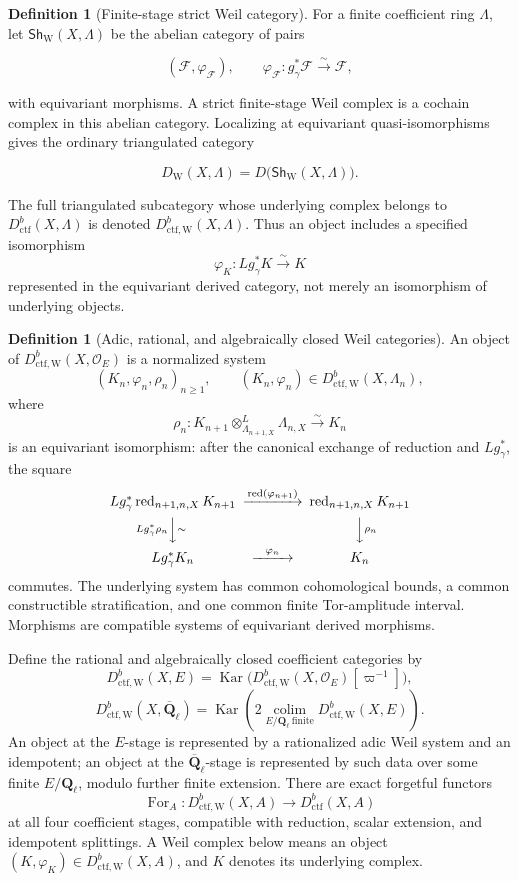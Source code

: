 \documentclass[10pt]{article}
\theoremstyle{definition}
\newtheorem{definition}[theorem]{Definition}
\newcommand{\Ql}{\mathbf Q_\ell}
\newcommand{\Qlb}{\overline{\mathbf Q}_\ell}
\newcommand{\OO}{\mathcal O}
\newcommand{\Dctf}{D^b_{\mathrm{ctf}}}
\newcommand{\red}{\operatorname{red}}
\newcommand{\DctfW}{D^b_{\mathrm{ctf,W}}}
\begin{document}
\begin{definition}[Finite-stage strict Weil category]
For a finite coefficient ring \(\Lambda\), let
\(\mathsf{Sh}_{\mathrm W}(X,\Lambda)\) be the abelian category of pairs

\[
 (\mathcal F,\varphi_{\mathcal F}),\qquad
 \varphi_{\mathcal F}:g_\gamma^*\mathcal F\xrightarrow{\sim}\mathcal F,
\]

with equivariant morphisms.  A strict finite-stage Weil complex is a cochain
complex in this abelian category.  Localizing at equivariant
quasi-isomorphisms gives the ordinary triangulated category

\[
 D_{\mathrm W}(X,\Lambda)=
 D\bigl(\mathsf{Sh}_{\mathrm W}(X,\Lambda)\bigr).
\]

The full triangulated subcategory whose underlying complex belongs to
\(\Dctf(X,\Lambda)\) is denoted
\(\DctfW(X,\Lambda)\).  Thus an object includes a specified isomorphism
\[
 \varphi_K:Lg_\gamma^*K\xrightarrow{\sim}K
\]
represented in the equivariant derived category, not merely an isomorphism
of underlying objects.
\end{definition}

\begin{definition}[Adic, rational, and algebraically closed Weil categories]
An object of \(\DctfW(X,\OO_E)\) is a normalized system
\[
 (K_n,\varphi_n,\rho_n)_{n\geq1},
 \qquad (K_n,\varphi_n)\in\DctfW(X,\Lambda_n),
\]
where
\[
 \rho_n:
 K_{n+1}\otimes^L_{\Lambda_{n+1,X}}\Lambda_{n,X}
 \xrightarrow{\sim}K_n
\]
is an equivariant isomorphism: after the canonical exchange of reduction and
\(Lg_\gamma^*\), the square
\[
\begin{CD}
Lg_\gamma^*\red_{n+1,n,X}K_{n+1}
 @>{\red(\varphi_{n+1})}>> \red_{n+1,n,X}K_{n+1}\\
@V{Lg_\gamma^*\rho_n}V{\sim}V @VV{\rho_n}V\\
Lg_\gamma^*K_n @>{\varphi_n}>> K_n
\end{CD}
\]
commutes.  The underlying system has common cohomological bounds, a common
constructible stratification, and one common finite Tor-amplitude interval.
Morphisms are compatible systems of equivariant derived morphisms.

Define the rational and algebraically closed coefficient categories by
\[
 \DctfW(X,E)=
 \operatorname{Kar}\bigl(\DctfW(X,\OO_E)[\varpi^{-1}]\bigr),
\]
\[
 \DctfW(X,\Qlb)=
 \operatorname{Kar}\!\left(
  2\!\operatorname*{colim}_{E/\Ql\ \mathrm{finite}}\DctfW(X,E)
 \right).
\]
An object at the \(E\)-stage is represented by a rationalized adic
Weil system and an idempotent; an object at the \(\Qlb\)-stage is represented
by such data over some finite \(E/\Ql\), modulo further finite extension.
There are exact forgetful functors
\[
 \operatorname{For}_A:\DctfW(X,A)\longrightarrow\Dctf(X,A)
\]
at all four coefficient stages, compatible with reduction, scalar extension,
and idempotent splittings.  A Weil complex below means an object
\((K,\varphi_K)\in\DctfW(X,A)\), and \(K\) denotes its underlying complex.
\end{definition}
\end{document}
